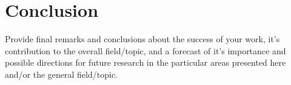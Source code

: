 \chapter{Conclusion}\label{chap:conclusion}

Provide final remarks and conclusions about the success of your work, it's contribution to the overall field/topic, and a forecast of it's importance and possible directions for future research in the particular areas presented here and/or the general field/topic. 
\endinput
